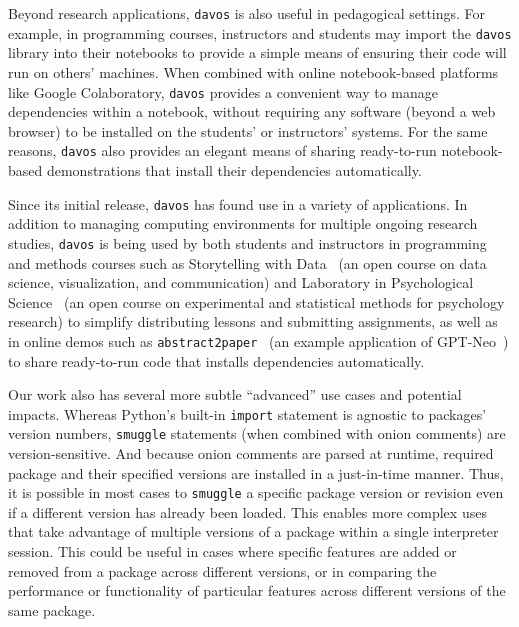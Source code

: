 \documentclass[preprint,12pt,a4paper]{elsarticle}
\begin{document}
Beyond research applications, \texttt{davos} is also useful in
pedagogical settings. For example, in programming courses,
instructors and students may import the \texttt{davos} library into
their notebooks to provide a simple means of ensuring their code will
run on others' machines. When combined with online notebook-based
platforms like Google Colaboratory, \texttt{davos} provides a
convenient way to manage dependencies within a notebook, without
requiring any software (beyond a web browser) to be installed on the
students' or instructors' systems. For the same reasons,
\texttt{davos} also provides an elegant means of sharing ready-to-run
notebook-based demonstrations that install their dependencies
automatically.

Since its initial release, \texttt{davos} has found use in a variety
of applications. In addition to managing computing environments
for multiple ongoing research studies, \texttt{davos} is being used by
both students and instructors in programming and methods courses such as
Storytelling with Data~\cite{Mann21d} (an open course on data science,
visualization, and communication) and Laboratory in Psychological
Science~\cite{Mann22} (an open course on experimental and statistical
methods for psychology research) to simplify distributing lessons and
submitting assignments, as well as in online demos such as
\texttt{abstract2paper}~\cite{Mann21e} (an example application of
GPT-Neo~\cite{GaoEtal20, BlacEtal21}) to share ready-to-run code that
installs dependencies automatically.

Our work also has several more subtle ``advanced'' use cases and
potential impacts. Whereas Python's built-in \texttt{import}
statement is agnostic to packages' version numbers, \texttt{smuggle}
statements (when combined with onion comments) are version-sensitive.
And because onion comments are parsed at runtime, required package and
their specified versions are installed in a just-in-time manner. Thus, it is possible
in most cases to \texttt{smuggle} a specific package version or revision even if
a different version has already been loaded. This enables more complex uses
that take advantage of multiple versions of a package within a single interpreter
session. This could be useful in cases where specific features are added or
removed from a package across different versions, or in comparing the
performance or functionality of particular features across different versions of
the same package.
\end{document}
